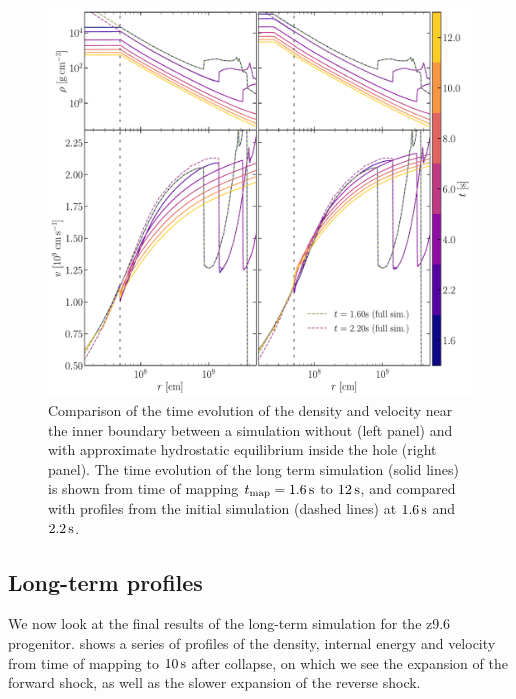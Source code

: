 \begin{figure}[ht!]
    \centering
    \includegraphics[width=1.0\linewidth]{figures/compare_grad.pdf}
    \caption{Comparison of the time evolution of the density and velocity near the inner boundary between a simulation without (left panel) and with approximate hydrostatic equilibrium inside the hole (right panel). The time evolution of the long term simulation (solid lines) is shown from time of mapping \(t_\mathrm{map} = 1.6\,\mathrm{s}\) to \(12\,\mathrm{s}\), and compared with profiles from the initial simulation (dashed lines) at \(1.6\,\mathrm{s}\) and \(2.2\,\mathrm{s}\).}
    \label{fig:compare_grad}
\end{figure}

\clearpage

\subsection{Long-term profiles}

We now look at the final results of the long-term simulation for the z9.6 progenitor.  shows a series of profiles of the density, internal energy and velocity from time of mapping to \(10\,\mathrm{s}\) after collapse, on which we see the expansion of the forward shock, as well as the slower expansion of the reverse shock.

